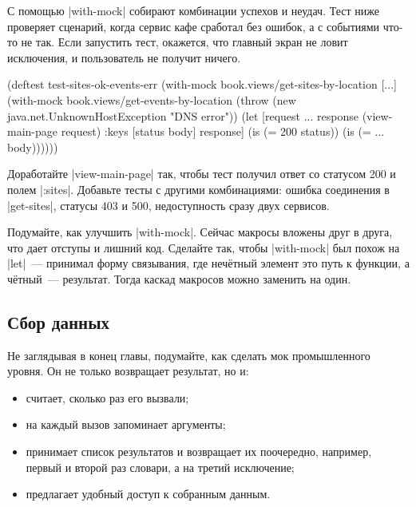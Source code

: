 С помощью \spverb|with-mock| собирают комбинации успехов и неудач. Тест ниже
проверяет сценарий, когда сервис кафе сработал без ошибок, а с событиями что-то
не так. Если запустить тест, окажется, что главный экран не ловит исключения, и
пользователь не получит ничего.

\begin{english}
  \begin{clojure}
(deftest test-sites-ok-events-err
  (with-mock book.views/get-sites-by-location [...]
    (with-mock book.views/get-events-by-location
      (throw (new java.net.UnknownHostException "DNS error"))
      (let [request {...}
            response (view-main-page request)
            {:keys [status body]} response]
        (is (= 200 status))
        (is (= {...} body))))))
  \end{clojure}
\end{english}

Доработайте \spverb|view-main-page| так, чтобы тест получил ответ со статусом
200 и полем \spverb|:sites|. Добавьте тесты с другими комбинациями: ошибка
соединения в \spverb|get-sites|, статусы 403 и 500, недоступность сразу двух
сервисов.

Подумайте, как улучшить \spverb|with-mock|. Сейчас макросы вложены друг в друга,
что дает отступы и лишний код. Сделайте так, чтобы \spverb|with-mock| был похож
на \spverb|let|~--- принимал форму связывания, где неч\"{е}тный элемент это путь
к функции, а ч\"{е}тный~--- результат. Тогда каскад макросов можно заменить на
один.

\subsection{Сбор данных}


Не заглядывая в конец главы, подумайте, как сделать мок промышленного уровня. Он
не только возвращает результат, но и:

\begin{itemize}

\item
  считает, сколько раз его вызвали;

\item
  на каждый вызов запоминает аргументы;

\item
  принимает список результатов и возвращает их поочередно, например, первый и
  второй раз словари, а на третий исключение;

\item
  предлагает удобный доступ к собранным данным.

\end{itemize}

